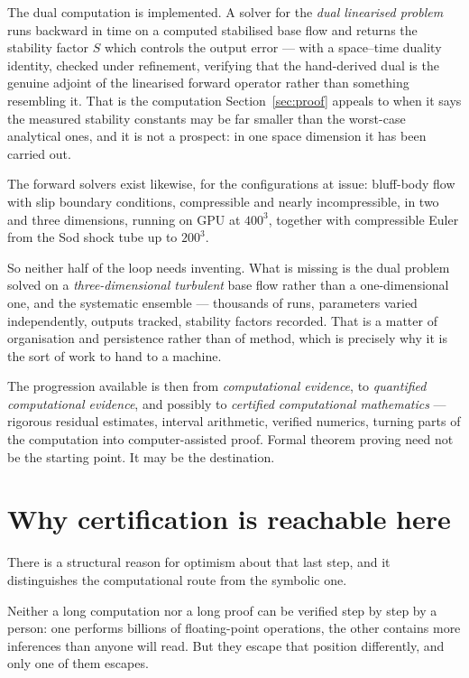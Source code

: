 \documentclass[11pt]{article}
\begin{document}
The dual computation is implemented. A solver for the \emph{dual linearised problem} runs backward in
time on a computed stabilised base flow and returns the stability factor $S$ which controls the
output error --- with a space--time duality identity, checked under refinement, verifying that the
hand-derived dual is the genuine adjoint of the linearised forward operator rather than something
resembling it. That is the computation Section~\ref{sec:proof} appeals to when it says the measured
stability constants may be far smaller than the worst-case analytical ones, and it is not a
prospect: in one space dimension it has been carried out.

The forward solvers exist likewise, for the configurations at issue: bluff-body flow with slip
boundary conditions, compressible and nearly incompressible, in two and three dimensions, running on
GPU at $400^3$, together with compressible Euler from the Sod shock tube up to $200^3$.

So neither half of the loop needs inventing. What is missing is the dual problem solved on a
\emph{three-dimensional turbulent} base flow rather than a one-dimensional one, and the systematic
ensemble --- thousands of runs, parameters varied independently, outputs tracked, stability factors
recorded. That is a matter of organisation and persistence rather than of method, which is precisely
why it is the sort of work to hand to a machine.

The progression available is then from \emph{computational evidence}, to \emph{quantified
computational evidence}, and possibly to \emph{certified computational mathematics} --- rigorous
residual estimates, interval arithmetic, verified numerics, turning parts of the computation into
computer-assisted proof. Formal theorem proving need not be the starting point. It may be the
destination.

\section{Why certification is reachable here}\label{sec:certify}

There is a structural reason for optimism about that last step, and it distinguishes the computational
route from the symbolic one.

Neither a long computation nor a long proof can be verified step by step by a person: one performs
billions of floating-point operations, the other contains more inferences than anyone will read. But
they escape that position differently, and only one of them escapes.
\end{document}
